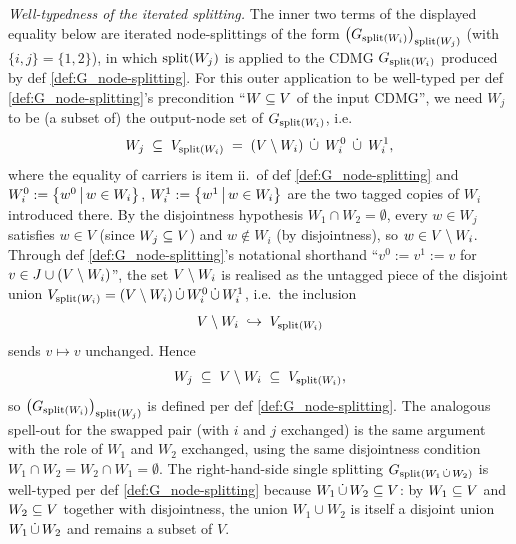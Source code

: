 \documentclass[main]{subfiles}
\begin{document}
\begin{Lem}
    \emph{Well-typedness of the iterated splitting.}
    The inner two terms of the displayed equality below are iterated node-splittings of the form $\left ( G_{\mathrm{split}(W_i)} \right )_{\mathrm{split}(W_j)}$ (with $\{i, j\} = \{1, 2\}$), in which $\mathrm{split}(W_j)$ is applied to the CDMG $G_{\mathrm{split}(W_i)}$ produced by def \ref{def:G_node-splitting}. For this outer application to be well-typed per def \ref{def:G_node-splitting}'s precondition ``$W \subseteq V$ of the input CDMG'', we need $W_j$ to be (a subset of) the output-node set of $G_{\mathrm{split}(W_i)}$, i.e.\
    \[ W_j \;\subseteq\; V_{\mathrm{split}(W_i)} \;=\; (V \setminus W_i) \;\,\dot{\cup}\,\; W_i^0 \;\,\dot{\cup}\,\; W_i^1, \]
    where the equality of carriers is item ii.\ of def \ref{def:G_node-splitting} and $W_i^0 := \left \{ w^0 \,\middle|\, w \in W_i \right \}$, $W_i^1 := \left \{ w^1 \,\middle|\, w \in W_i \right \}$ are the two tagged copies of $W_i$ introduced there. By the disjointness hypothesis $W_1 \cap W_2 = \emptyset$, every $w \in W_j$ satisfies $w \in V$ (since $W_j \subseteq V$) and $w \notin W_i$ (by disjointness), so $w \in V \setminus W_i$. Through def \ref{def:G_node-splitting}'s notational shorthand ``$v^0 := v^1 := v$ for $v \in J \cup (V \setminus W_i)$'', the set $V \setminus W_i$ is realised as the untagged piece of the disjoint union $V_{\mathrm{split}(W_i)} = (V \setminus W_i) \,\dot{\cup}\, W_i^0 \,\dot{\cup}\, W_i^1$, i.e.\ the inclusion
    \[ V \setminus W_i \;\hookrightarrow\; V_{\mathrm{split}(W_i)} \]
    sends $v \mapsto v$ unchanged. Hence
    \[ W_j \;\subseteq\; V \setminus W_i \;\subseteq\; V_{\mathrm{split}(W_i)}, \]
    so $\left ( G_{\mathrm{split}(W_i)} \right )_{\mathrm{split}(W_j)}$ is defined per def \ref{def:G_node-splitting}. The analogous spell-out for the swapped pair (with $i$ and $j$ exchanged) is the same argument with the role of $W_1$ and $W_2$ exchanged, using the same disjointness condition $W_1 \cap W_2 = W_2 \cap W_1 = \emptyset$. The right-hand-side single splitting $G_{\mathrm{split}(W_1 \,\dot{\cup}\, W_2)}$ is well-typed per def \ref{def:G_node-splitting} because $W_1 \,\dot{\cup}\, W_2 \subseteq V$: by $W_1 \subseteq V$ and $W_2 \subseteq V$ together with disjointness, the union $W_1 \cup W_2$ is itself a disjoint union $W_1 \,\dot{\cup}\, W_2$ and remains a subset of $V$.


\end{Lem}
\end{document}
